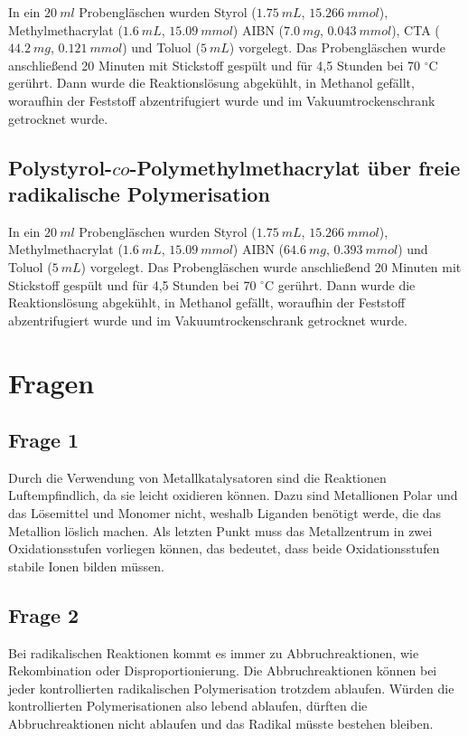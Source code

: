 \documentclass[10pt,a4paper,ngerman]{scrartcl}
\newcommand{\celsius}{^{\circ}\mathrm{C}}
\begin{document}
		In ein $\SI{20}{ml}$ Probengläschen wurden Styrol ($\SI{1,75}{mL}$, $\SI{15,266}{mmol}$), Methylmethacrylat ($\SI{1,6}{mL}$, $\SI{15,09}{mmol}$) AIBN ($\SI{7,0}{mg}$, $\SI{0,043}{mmol}$), 
		CTA ($\SI{44,2}{mg}$, $\SI{0,121}{mmol}$) und Toluol ($\SI{5}{mL}$) vorgelegt. Das Probengläschen wurde 
		anschließend 20 Minuten mit Stickstoff gespült und für 4,5 Stunden bei 70 $\celsius$ gerührt. Dann wurde die Reaktionslösung abgekühlt, in Methanol gefällt, 
		woraufhin der Feststoff abzentrifugiert wurde und im Vakuumtrockenschrank getrocknet wurde.

	\subsection{Polystyrol-$co$-Polymethylmethacrylat über freie radikalische Polymerisation}

		In ein $\SI{20}{ml}$ Probengläschen wurden Styrol ($\SI{1,75}{mL}$, $\SI{15,266}{mmol}$), Methylmethacrylat ($\SI{1,6}{mL}$, $\SI{15,09}{mmol}$) AIBN ($\SI{64,6}{mg}$, $\SI{0,393}{mmol}$) 
		und Toluol ($\SI{5}{mL}$) vorgelegt. Das Probengläschen wurde 
		anschließend 20 Minuten mit Stickstoff gespült und für 4,5 Stunden bei 70 $\celsius$ gerührt. Dann wurde die Reaktionslösung abgekühlt, in Methanol gefällt, 
		woraufhin der Feststoff abzentrifugiert wurde und im Vakuumtrockenschrank getrocknet wurde.
	
\section{Fragen}

	\subsection{Frage 1}

		Durch die Verwendung von Metallkatalysatoren sind die Reaktionen Luftempfindlich, da sie leicht oxidieren können. Dazu sind Metallionen Polar und das Lösemittel 
		und Monomer nicht, weshalb Liganden benötigt werde, die das Metallion löslich machen. Als letzten Punkt muss das Metallzentrum in zwei Oxidationsstufen vorliegen 
		können, das bedeutet, dass beide Oxidationsstufen stabile Ionen bilden müssen.
	
	\subsection{Frage 2}

		Bei radikalischen Reaktionen kommt es immer zu Abbruchreaktionen, wie Rekombination oder Disproportionierung. Die Abbruchreaktionen können bei jeder kontrollierten 
		radikalischen Polymerisation trotzdem ablaufen. Würden die kontrollierten Polymerisationen also lebend ablaufen, dürften die Abbruchreaktionen nicht ablaufen und 
		das Radikal müsste bestehen bleiben.
	
\end{document}
